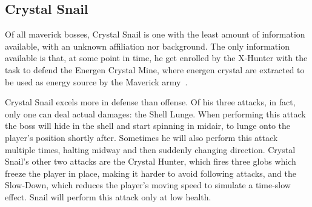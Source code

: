 \subsection{Crystal Snail}\label{boss:Crystal_snail}
Of all maverick bosses, Crystal Snail is one with the least amount of information available, with an unknown affiliation nor background. The only information available is that, at some point in time, he get enrolled by the X-Hunter with the task to defend the Energen Crystal Mine, where energen crystal are extracted to be used as energy source by the Maverick army~\cite{wayback:X2_resources}.

Crystal Snail excels more in defense than offense. Of his three attacks, in fact, only one can deal actual damages: the Shell Lunge. When performing this attack the boss will hide in the shell and start spinning in midair, to lunge onto the player's position shortly after. Sometimes he will also perform this attack multiple times, halting midway and then suddenly changing direction. Crystal Snail's other two attacks are the Crystal Hunter, which fires three globs which freeze the player in place, making it harder to avoid following attacks, and the Slow-Down, which reduces the player's moving speed to simulate a time-slow effect. Snail will perform this attack only at low health.
